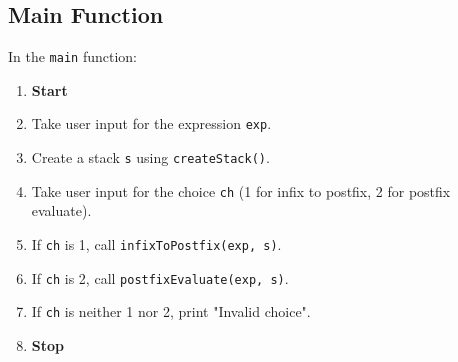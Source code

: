 {  \subsection{Main Function}
  In the \texttt{main} function:
  \begin{enumerate}[label=\arabic*:, start=1]
    \item \textbf{Start}
    \item Take user input for the expression \texttt{exp}.
    \item Create a stack \texttt{s} using \texttt{createStack()}.
    \item Take user input for the choice \texttt{ch} (1 for infix to postfix, 2 for postfix evaluate).
    \item If \texttt{ch} is 1, call \texttt{infixToPostfix(exp, s)}.
    \item If \texttt{ch} is 2, call \texttt{postfixEvaluate(exp, s)}.
    \item If \texttt{ch} is neither 1 nor 2, print "Invalid choice".
    \item \textbf{Stop}
  \end{enumerate}
 }
\newblock
